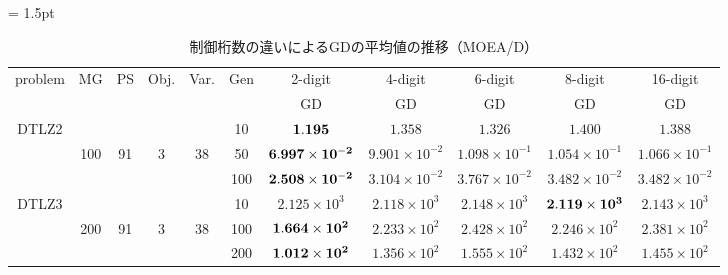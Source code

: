 \documentclass[../main/main]{subfiles}
\begin{document}
\begin{table}[htbp]
\fontsize{7.5pt}{7.5pt} \selectfont
\tabcolsep = 1.5pt
\centering
\caption{制御桁数の違いによるGDの平均値の推移（MOEA/D）}
\label{tbl:gd_moead}
\begin{tabular}{c|ccccc|c|c|c|c|c}
\hline 
problem & MG & PS & Obj. & Var. & Gen & 2-digit & 4-digit & 6-digit & 8-digit & 16-digit \\ 
\cline{7-11}
&&&&&&GD&GD&GD&GD&GD\\
\hline
\multirow{3}{*}{DTLZ2} &        &  & &     & 10 &$\bf{1.195}$ & $1.358$ & $1.326$ & $1.400$ & $1.388$\\
  				   & 100 & 91 & 3 & 38 & 50 &$\bf{6.997 \times 10^{-2}}$ & $9.901 \times 10^{-2}$ & $1.098 \times 10^{-1}$ & $1.054 \times 10^{-1}$ & $1.066 \times 10^{-1}$\\
				   &        &     &           &   &100 & $\bf{2.508 \times 10^{-2}}$ & $3.104 \times 10^{-2}$ & $3.767 \times 10^{-2}$ & $3.482 \times 10^{-2}$ & $3.482 \times 10^{-2}$\\
\hline
\multirow{3}{*}{DTLZ3} &     &&   &       & 10 &$2.125 \times 10^{3}$ & $2.118 \times 10^{3}$ & $2.148 \times 10^{3}$ & $\bf{2.119 \times 10^{3}}$ & $2.143 \times 10^{3}$\\
  				   & 200 & 91 & 3 & 38 &100 &$\bf{1.664 \times 10^{2}}$ & $2.233 \times 10^{2}$ & $2.428 \times 10^{2}$ & $2.246 \times 10^{2}$ & $2.381 \times 10^{2}$\\
				   &        &   &&     &200 & $\bf{1.012 \times 10^{2}}$ & $1.356 \times 10^{2}$ & $1.555 \times 10^{2}$ & $1.432 \times 10^{2}$ & $1.455 \times 10^{2}$\\


\end{tabular}
\end{table}
\end{document}
